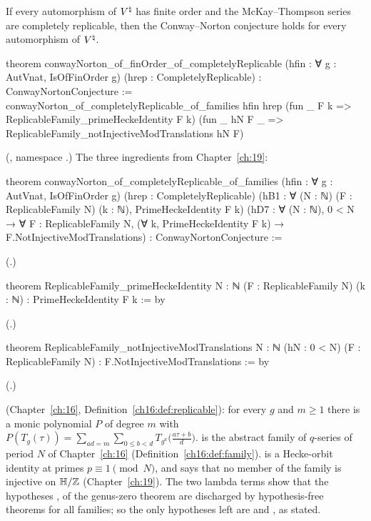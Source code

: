 \begin{theorem}\label{ch20:thm:cnrep}
If every automorphism of ${V^{\natural}}$ has finite order and the McKay--Thompson series are completely replicable, then the
Conway--Norton conjecture holds for every automorphism of ${V^{\natural}}$.
\end{theorem}
\begin{leancode}
theorem conwayNorton_of_finOrder_of_completelyReplicable
    (hfin : ∀ g : AutVnat, IsOfFinOrder g) (hrep : CompletelyReplicable) :
    ConwayNortonConjecture :=
  conwayNorton_of_completelyReplicable_of_families hfin hrep
    (fun _ F k => ReplicableFamily_primeHeckeIdentity F k)
    (fun _ hN F _ => ReplicableFamily_notInjectiveModTranslations hN F)
\end{leancode}
(, namespace .)  The three
ingredients from Chapter~\ref{ch:19}:
\begin{leancode}
theorem conwayNorton_of_completelyReplicable_of_families (hfin : ∀ g : AutVnat, IsOfFinOrder g)
    (hrep : CompletelyReplicable)
    (hB1 : ∀ (N : ℕ) (F : ReplicableFamily N) (k : ℕ), PrimeHeckeIdentity F k)
    (hD7 : ∀ (N : ℕ), 0 < N → ∀ F : ReplicableFamily N, (∀ k, PrimeHeckeIdentity F k) →
      F.NotInjectiveModTranslations) :
    ConwayNortonConjecture :=
\end{leancode}
(.)
\begin{leancode}
theorem ReplicableFamily_primeHeckeIdentity {N : ℕ} (F : ReplicableFamily N) (k : ℕ) :
    PrimeHeckeIdentity F k := by
\end{leancode}
(.)
\begin{leancode}
theorem ReplicableFamily_notInjectiveModTranslations {N : ℕ} (hN : 0 < N)
    (F : ReplicableFamily N) : F.NotInjectiveModTranslations := by
\end{leancode}
(.)
\begin{dictionary}
 (Chapter~\ref{ch:16}, Definition~\ref{ch16:def:replicable}): for every $g$ and $m\ge1$ there is a
monic polynomial $P$ of degree $m$ with $P(T_g(\tau))=\sum_{ad=m}\sum_{0\le b<d}T_{g^a}\bigl(\tfrac{a\tau+b}d\bigr)$.
 is the abstract family of $q$-series of period $N$ of Chapter~\ref{ch:16}
(Definition~\ref{ch16:def:family}).   is a Hecke-orbit identity at primes $p\equiv1\pmod N$, and
 says that no member of the family is injective on $\mathbb H/{\mathbb{Z}}$ (Chapter~\ref{ch:19}).
The two lambda terms show that the hypotheses ,  of the genus-zero theorem are discharged by
hypothesis-free theorems for all families; so the only hypotheses left are  and , as stated.
\end{dictionary}
